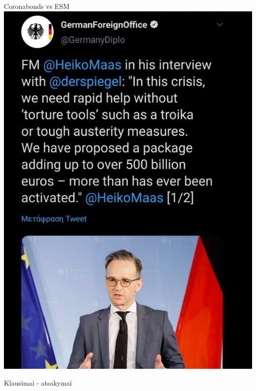 \documentclass[aspectratio=169, 11pt]{beamer}
\begin{document}
\begin{frame}{Coronabonds vs ESM}
\centering
\includegraphics[scale=.25]{maas.png}

\end{frame}

\begin{frame}
\begin{LARGE}
Klausimai - atsakymai
\end{LARGE}
\end{frame}
\end{document}
